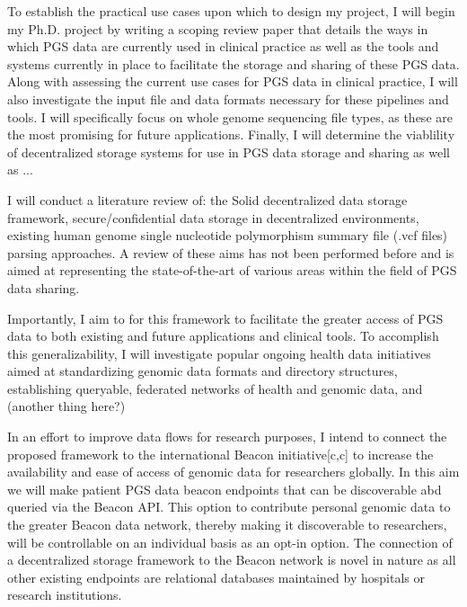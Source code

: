 \documentclass[a4paper,11pt]{article}
\begin{document}
To establish the practical use cases upon which to design my project, I will begin my Ph.D. project by writing a scoping review paper that details the ways in which PGS data are currently used in clinical practice as well as the tools and systems currently in place to facilitate the storage and sharing of these PGS data. 
Along with assessing the current use cases for PGS data in clinical practice, I will also investigate the input file and data formats necessary for these pipelines and tools. I will specifically focus on whole genome sequencing file types, as these are the most promising for future applications. 
Finally, I will determine the viablility of decentralized storage systems for use in PGS data storage and sharing as well as ...

I will conduct a literature review of: the Solid decentralized data storage framework, secure/confidential data storage in decentralized environments, existing human genome single nucleotide polymorphism summary file (.vcf files) parsing approaches. A review of these aims has not been performed before and is aimed at representing the state-of-the-art of various areas within the field of PGS data sharing.

Importantly, I aim to for this framework to facilitate the greater access of PGS data to both existing and future applications and clinical tools. 
To accomplish this generalizability, I will investigate popular ongoing health data initiatives aimed at standardizing genomic data formats and directory structures, establishing queryable, federated networks of health and genomic data, and (another thing here?)

In an effort to improve data flows for research purposes, I intend to connect the proposed framework to the international Beacon initiative[c,c] to increase the availability and ease of access of genomic data for researchers globally. 
In this aim we will make patient PGS data beacon endpoints that can be discoverable abd queried via the Beacon API.
This option to contribute personal genomic data to the greater Beacon data network, thereby making it discoverable to researchers, will be controllable on an individual basis as an opt-in option. 
The connection of a decentralized storage framework to the Beacon network is novel in nature as all other existing endpoints are relational databases maintained by hospitals or research institutions.
\end{document}
